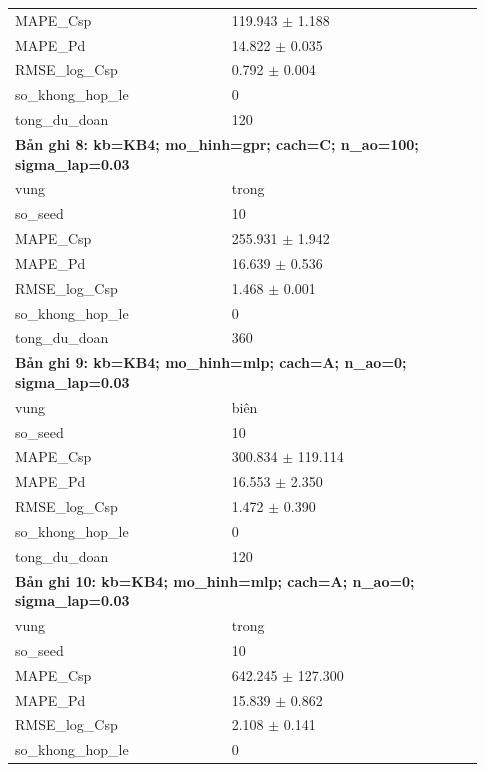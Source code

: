 \begin{longtable}{p{0.43\linewidth}p{0.50\linewidth}}
MAPE\_\allowbreak Csp & 119.943 $\pm$ 1.188 \\
MAPE\_\allowbreak Pd & 14.822 $\pm$ 0.035 \\
RMSE\_\allowbreak log\_\allowbreak Csp & 0.792 $\pm$ 0.004 \\
so\_\allowbreak khong\_\allowbreak hop\_\allowbreak le & 0 \\
tong\_\allowbreak du\_\allowbreak doan & 120 \\
\midrule
\multicolumn{2}{p{0.95\linewidth}}{\textbf{Bản ghi 8: kb=KB4; mo\_hinh=gpr; cach=C; n\_ao=100; sigma\_lap=0.03}} \\
vung & trong \\
so\_\allowbreak seed & 10 \\
MAPE\_\allowbreak Csp & 255.931 $\pm$ 1.942 \\
MAPE\_\allowbreak Pd & 16.639 $\pm$ 0.536 \\
RMSE\_\allowbreak log\_\allowbreak Csp & 1.468 $\pm$ 0.001 \\
so\_\allowbreak khong\_\allowbreak hop\_\allowbreak le & 0 \\
tong\_\allowbreak du\_\allowbreak doan & 360 \\
\midrule
\multicolumn{2}{p{0.95\linewidth}}{\textbf{Bản ghi 9: kb=KB4; mo\_hinh=mlp; cach=A; n\_ao=0; sigma\_lap=0.03}} \\
vung & biên \\
so\_\allowbreak seed & 10 \\
MAPE\_\allowbreak Csp & 300.834 $\pm$ 119.114 \\
MAPE\_\allowbreak Pd & 16.553 $\pm$ 2.350 \\
RMSE\_\allowbreak log\_\allowbreak Csp & 1.472 $\pm$ 0.390 \\
so\_\allowbreak khong\_\allowbreak hop\_\allowbreak le & 0 \\
tong\_\allowbreak du\_\allowbreak doan & 120 \\
\midrule
\multicolumn{2}{p{0.95\linewidth}}{\textbf{Bản ghi 10: kb=KB4; mo\_hinh=mlp; cach=A; n\_ao=0; sigma\_lap=0.03}} \\
vung & trong \\
so\_\allowbreak seed & 10 \\
MAPE\_\allowbreak Csp & 642.245 $\pm$ 127.300 \\
MAPE\_\allowbreak Pd & 15.839 $\pm$ 0.862 \\
RMSE\_\allowbreak log\_\allowbreak Csp & 2.108 $\pm$ 0.141 \\
so\_\allowbreak khong\_\allowbreak hop\_\allowbreak le & 0 \\

\end{longtable}
